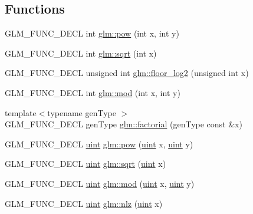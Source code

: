 \subsection*{Functions}
\begin{DoxyCompactItemize}
\item 
G\+L\+M\+\_\+\+F\+U\+N\+C\+\_\+\+D\+E\+C\+L int \hyperlink{group__gtx__integer_ga9642514a44a67afa70966d756f040ca9}{glm\+::pow} (int x, int y)
\item 
G\+L\+M\+\_\+\+F\+U\+N\+C\+\_\+\+D\+E\+C\+L int \hyperlink{group__gtx__integer_ga78e2e68330e91d350fcfc2f4831cad12}{glm\+::sqrt} (int x)
\item 
G\+L\+M\+\_\+\+F\+U\+N\+C\+\_\+\+D\+E\+C\+L unsigned int \hyperlink{group__gtx__integer_ga7011b4e1c1e1ed492149b028feacc00e}{glm\+::floor\+\_\+log2} (unsigned int x)
\item 
G\+L\+M\+\_\+\+F\+U\+N\+C\+\_\+\+D\+E\+C\+L int \hyperlink{group__gtx__integer_gab9d22df91aac4d9eb925a4910f556f1b}{glm\+::mod} (int x, int y)
\item 
{\footnotesize template$<$typename gen\+Type $>$ }\\G\+L\+M\+\_\+\+F\+U\+N\+C\+\_\+\+D\+E\+C\+L gen\+Type \hyperlink{group__gtx__integer_ga8cbd3120905f398ec321b5d1836e08fb}{glm\+::factorial} (gen\+Type const \&x)
\item 
G\+L\+M\+\_\+\+F\+U\+N\+C\+\_\+\+D\+E\+C\+L \hyperlink{stb__image_8c_a91ad9478d81a7aaf2593e8d9c3d06a14}{uint} \hyperlink{group__gtx__integer_gaa8229e850c3cc4ad83492fe390ada044}{glm\+::pow} (\hyperlink{stb__image_8c_a91ad9478d81a7aaf2593e8d9c3d06a14}{uint} x, \hyperlink{stb__image_8c_a91ad9478d81a7aaf2593e8d9c3d06a14}{uint} y)
\item 
G\+L\+M\+\_\+\+F\+U\+N\+C\+\_\+\+D\+E\+C\+L \hyperlink{stb__image_8c_a91ad9478d81a7aaf2593e8d9c3d06a14}{uint} \hyperlink{group__gtx__integer_ga457e9efca8339bf918d319e9c55f7c8f}{glm\+::sqrt} (\hyperlink{stb__image_8c_a91ad9478d81a7aaf2593e8d9c3d06a14}{uint} x)
\item 
G\+L\+M\+\_\+\+F\+U\+N\+C\+\_\+\+D\+E\+C\+L \hyperlink{stb__image_8c_a91ad9478d81a7aaf2593e8d9c3d06a14}{uint} \hyperlink{group__gtx__integer_gab8f9ec0ca93ca90669434224818f0750}{glm\+::mod} (\hyperlink{stb__image_8c_a91ad9478d81a7aaf2593e8d9c3d06a14}{uint} x, \hyperlink{stb__image_8c_a91ad9478d81a7aaf2593e8d9c3d06a14}{uint} y)
\item 
G\+L\+M\+\_\+\+F\+U\+N\+C\+\_\+\+D\+E\+C\+L \hyperlink{stb__image_8c_a91ad9478d81a7aaf2593e8d9c3d06a14}{uint} \hyperlink{group__gtx__integer_gacbe62fd2384464c16ea30ecc4defc11c}{glm\+::nlz} (\hyperlink{stb__image_8c_a91ad9478d81a7aaf2593e8d9c3d06a14}{uint} x)
\end{DoxyCompactItemize}


